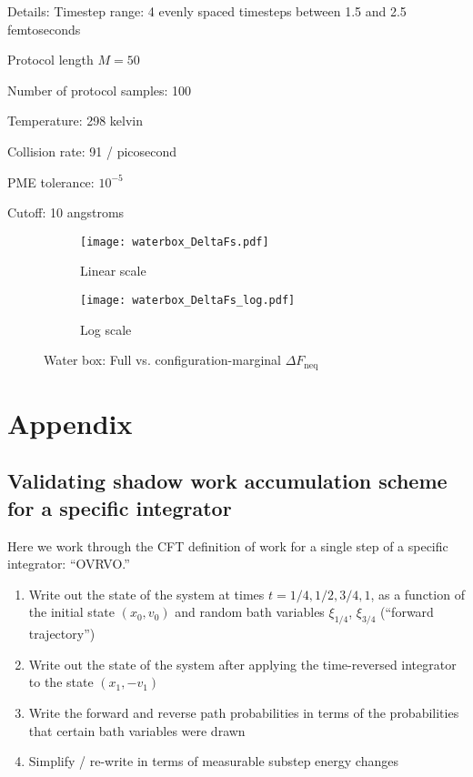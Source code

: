 \documentclass[11pt]{article}
\begin{document}
Details:
Timestep range: 4 evenly spaced timesteps between 1.5 and 2.5 femtoseconds

Protocol length $M=50$

Number of protocol samples: 100

Temperature: 298 kelvin

Collision rate: 91 / picosecond

PME tolerance: $10^{-5}$

Cutoff: 10 angstroms

\graphicspath{{/Users/joshuafass/Documents/Code/integrator-benchmark/figures/}}

\begin{figure}[h] 
\centering
	\begin{subfigure}[b]{0.3\textwidth}
		\texttt{[image: waterbox\_DeltaFs.pdf]}
		\caption{Linear scale}
	\end{subfigure}
	\begin{subfigure}[b]{0.3\textwidth}
		\texttt{[image: waterbox\_DeltaFs\_log.pdf]}
		\caption{Log scale}
	\end{subfigure}
	\caption{Water box: Full vs. configuration-marginal $\Delta F_\text{neq}$}
\end{figure}

\section{Appendix}



\subsection{Validating shadow work accumulation scheme for a specific integrator}
Here we work through the CFT definition of work for a single step of a specific integrator: ``OVRVO.''
\begin{enumerate}
\item Write out the state of the system at times $t=1/4, 1/2, 3/4, 1$, as a function of the initial state $(x_0, v_0)$ and random bath variables $\xi_{1/4}$, $\xi_{3/4}$ (``forward trajectory'')
\item Write out the state of the system after applying the time-reversed integrator to the state $(x_1, -v_1)$
\item Write the forward and reverse path probabilities in terms of the probabilities that certain bath variables were drawn
\item Simplify / re-write in terms of measurable substep energy changes
\end{enumerate}
\end{document}

